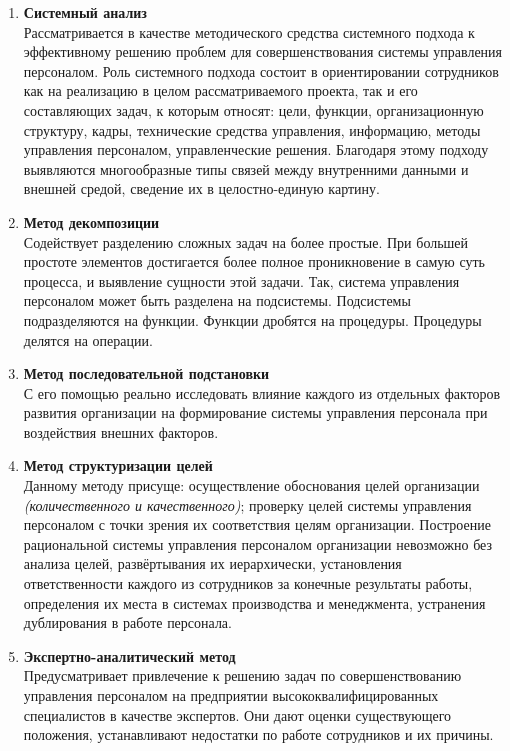 \documentclass[a4paper,12pt,oneside,final]{extarticle}
\numberwithin{equation}{section}
\begin{document}
\begin{enumerate}
	\item \textbf{Системный анализ} \\ 
	Рассматривается в качестве методического средства системного подхода к эффективному решению проблем для совершенствования системы управления персоналом. 
	Роль системного подхода состоит в ориентировании сотрудников как на реализацию в целом рассматриваемого проекта, так и его составляющих задач, к которым относят: цели, функции, организационную структуру, кадры, технические средства управления, информацию, методы управления персоналом, управленческие решения.
	Благодаря этому подходу выявляются многообразные типы связей между внутренними данными и внешней средой, сведение их в целостно-единую картину.
	\item \textbf{Метод декомпозиции} \\ 
	Содействует разделению сложных задач на более простые.
	При большей простоте элементов достигается более полное проникновение в самую суть процесса, и выявление сущности этой задачи. 
	Так, система управления персоналом может быть разделена на подсистемы. 
	Подсистемы подразделяются на функции. 
	Функции дробятся на процедуры. 
	Процедуры делятся на операции.
	\item \textbf{Метод последовательной подстановки} \\ 
	С его помощью реально исследовать влияние каждого из отдельных факторов развития организации на формирование системы управления персонала при воздействия внешних факторов.
	\item \textbf{Метод структуризации целей} \\ 
	Данному методу присуще: осуществление обоснования целей организации \textit{(количественного и качественного)}; проверку целей системы управления персоналом с точки зрения их соответствия целям организации. 
	Построение рациональной системы управления персоналом организации невозможно без анализа целей, развёртывания их иерархически, установления ответственности каждого из сотрудников за конечные результаты работы, определения их места в системах производства и менеджмента, устранения дублирования в работе персонала.
	\item \textbf{Экспертно-аналитический метод} \\ 
	Предусматривает привлечение к решению задач по совершенствованию управления персоналом на предприятии высококвалифицированных специалистов в качестве экспертов. 
	Они дают оценки существующего положения, устанавливают недостатки по работе сотрудников и их причины.

\end{enumerate}
\end{document}
